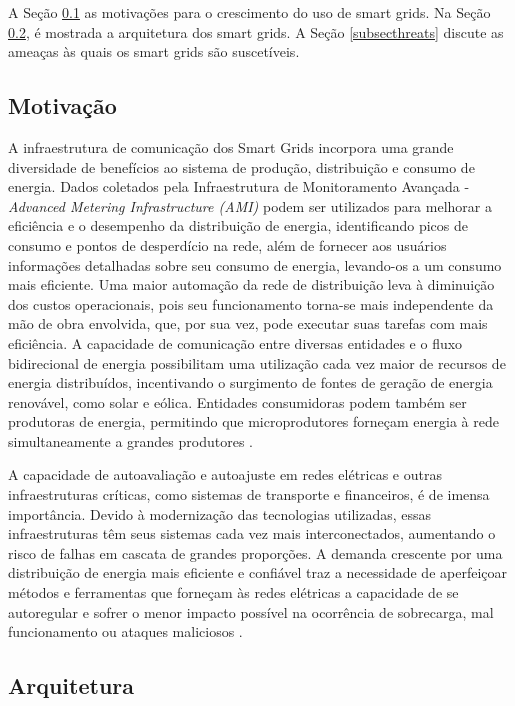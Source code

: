 \documentclass[cic,tc]{iiufrgs}
\begin{document}
A Seção \ref{subsecmotiv} as motivações para o crescimento do uso de smart grids. Na Seção \ref{subsecarq}, é mostrada a arquitetura dos smart grids. A Seção \ref{subsecthreats} discute as ameaças às quais os smart grids são suscetíveis.

\subsection{Motivação}
\label{subsecmotiv}

A  infraestrutura de comunicação dos Smart Grids incorpora uma grande diversidade de benefícios ao sistema de produção, distribuição e consumo de energia. Dados coletados pela Infraestrutura de Monitoramento Avançada - \emph{Advanced Metering Infrastructure (AMI)} podem ser utilizados para melhorar a eficiência e o desempenho da distribuição de energia, identificando picos de consumo e pontos de desperdício na rede, além de fornecer aos usuários informações detalhadas sobre seu consumo de energia, levando-os a um consumo mais eficiente. Uma maior automação da rede de distribuição leva à diminuição dos custos operacionais, pois seu funcionamento torna-se mais independente da mão de obra envolvida, que, por sua vez, pode executar suas tarefas com mais eficiência. A capacidade de comunicação entre diversas entidades e o fluxo bidirecional de energia possibilitam uma utilização cada vez maior de recursos de energia distribuídos, incentivando o surgimento de fontes de geração de energia renovável, como solar e eólica. Entidades consumidoras podem também ser produtoras de energia, permitindo que microprodutores forneçam energia à rede simultaneamente a grandes produtores \cite{2013survey}.

A capacidade de autoavaliação e autoajuste em redes elétricas e outras infraestruturas críticas, como sistemas de transporte e financeiros, é de imensa importância. Devido à modernização das tecnologias utilizadas, essas infraestruturas têm seus sistemas cada vez mais interconectados, aumentando o risco de falhas em cascata de grandes proporções. A demanda crescente por uma distribuição de energia mais eficiente e confiável traz a necessidade de aperfeiçoar métodos e ferramentas que forneçam às redes elétricas a capacidade de se autoregular e sofrer o menor impacto possível na ocorrência de sobrecarga, mal funcionamento ou ataques maliciosos \cite{massoud2005toward}.

\subsection{Arquitetura}
\label{subsecarq}
\end{document}
